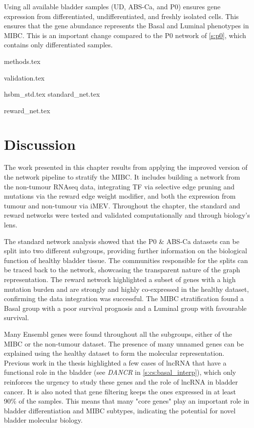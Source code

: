 Using all available bladder samples (UD, ABS-Ca, and P0) ensures gene expression from differentiated, undifferentiated, and freshly isolated cells. This ensures that the gene abundance represents the Basal and Luminal phenotypes in MIBC. This is an important change compared to the P0 network of \cref{s:p0}, which contains only differentiated samples.


{methods.tex}

{validation.tex}

{hsbm_std.tex}
{standard_net.tex}

{reward_net.tex}

\section{Discussion}

The work presented in this chapter results from applying the improved version of the network pipeline to stratify the MIBC. It includes building a network from the non-tumour RNAseq data, integrating TF via selective edge pruning and mutations via the reward edge weight modifier, and both the expression from tumour and non-tumour via iMEV. Throughout the chapter, the standard and reward networks were tested and validated computationally and through biology's lens. 

The standard network analysis showed that the P0 \& ABS-Ca datasets can be split into two different subgroups, providing further information on the biological function of healthy bladder tissue. The communities responsible for the splits can be traced back to the network, showcasing the transparent nature of the graph representation. The reward network highlighted a subset of genes with a high mutation burden and are strongly and highly co-expressed in the healthy dataset, confirming the data integration was successful. The MIBC stratification found a Basal group with a poor survival prognosis and a Luminal group with favourable survival.

Many Ensembl genes were found throughout all the subgroups, either of the MIBC or the non-tumour dataset. The presence of many unnamed genes can be explained using the healthy dataset to form the molecular representation. Previous work in the thesis highlighted a few cases of \acrfull{lncRNA} that have a functional role in the bladder (see \textit{DANCR} in \cref{s:cs:basal_interp}), which only reinforces the urgency to study these genes and the role of lncRNA in bladder cancer. It is also noted that gene filtering keeps the ones expressed in at least 90\% of the samples. This means that many "core genes" play an important role in bladder differentiation and MIBC subtypes, indicating the potential for novel bladder molecular biology. 

